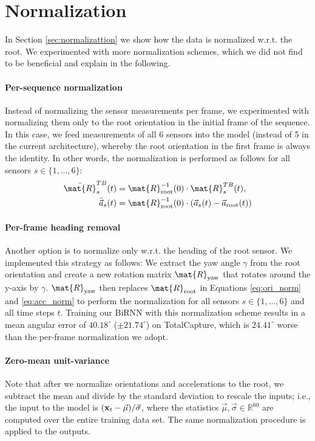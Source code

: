 \documentclass[acmtog]{acmart}
\begin{document}
\section{Normalization}\label{sec:appendix_normalization}
In Section \ref{sec:normalizattion} we show how the data is normalized w.r.t. the root. We experimented with more normalization schemes, which we did not find to be beneficial and explain in the following.

\paragraph*{Per-sequence normalization}
Instead of normalizing the sensor measurements per frame, we experimented with normalizing them only to the root orientation in the initial frame of the sequence. In this case, we feed measurements of all 6 sensors into the model (instead of 5 in the current architecture), whereby the root orientation in the first frame is always the identity. In other words, the normalization is performed as follows for all sensors $s \in \{1, \dotsc, 6 \}$:
\begin{align*}
\bar{\mat{R}}^{TB}_s(t) &= \mat{R}_\text{root}^{-1}(0) \cdot \mat{R}^{TB}_s(t), \\
\bar{\vec{a}}_s(t) &= \mat{R}_\text{root}^{-1}(0)\cdot(\vec{a}_s(t) - \vec{a}_\text{root}(t)) 
\end{align*}\paragraph*{Per-frame heading removal}
Another option is to normalize only w.r.t. the heading of the root sensor. We implemented this strategy as follows: We extract the yaw angle $\gamma$ from the root orientation and create a new rotation matrix  $\mat{R}_{\text{yaw}}$ that rotates around the y-axis by $\gamma$. $\mat{R}_{\text{yaw}}$ then replaces $\mat{R}_\text{root}$ in Equations \eqref{eq:ori_norm} and \eqref{eq:acc_norm} to perform the normalization for all sensors $s \in \{1, \dotsc, 6 \}$ and all time steps $t$. Training our BiRNN with this normalization scheme results in a mean angular error of $40.18^\circ$ ($\pm 21.74^\circ$) on TotalCapture, which is $24.41^\circ$ worse than the per-frame normalization we adopt.

\paragraph*{Zero-mean unit-variance}
Note that after we normalize orientations and accelerations to the root, we subtract the mean and divide by the standard deviation to rescale the inputs; i.e., the input to the model is $(\mathbf{x}_t - \vec{\mu})/\vec{\sigma}$, where the statistics $\vec{\mu}, \vec{\sigma} \in \mathbb{R}^{60}$ are computed over the entire training data set. The same normalization procedure is applied to the outputs.
\end{document}
